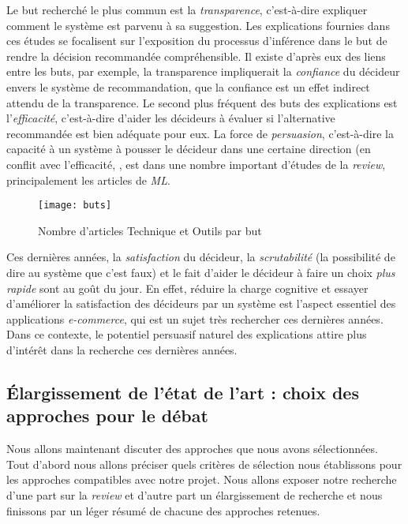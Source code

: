 \documentclass[a4paper, 11pt]{article}
\begin{document}
Le but recherché le plus commun est la \textit{transparence}, c'est-à-dire expliquer comment le système est parvenu à sa suggestion. Les explications fournies dans ces études se focalisent sur l’exposition du processus d’inférence dans le but de rendre la décision recommandée compréhensible. Il existe d'après eux des liens entre les buts, par exemple, la transparence impliquerait la \textit{confiance} du décideur envers le système de recommandation, que la confiance est un effet indirect attendu de la transparence. Le second plus fréquent des buts des explications est l’\textit{efficacité}, c'est-à-dire d’aider les décideurs à évaluer si l’alternative recommandée est bien adéquate pour eux. La force de \textit{persuasion}, c'est-à-dire la capacité à un système à pousser le décideur dans une certaine direction (en conflit avec l’efficacité, \textcolor{blue}{\citep{Chen2014}}, est dans une nombre important d’études de la \textit{review}, principalement les articles de \textit{ML}.

\begin{figure}[!h]
\begin{center}
\texttt{[image: buts]}
\caption{Nombre d'articles Technique et Outils par but}
\end{center}
\end{figure}


Ces dernières années, la \textit{satisfaction} du décideur, la \textit{scrutabilité} (la possibilité de dire au système que c’est faux) et le fait d’aider le décideur à faire un choix \textit{plus rapide} sont au goût du jour. En effet, réduire la charge cognitive et essayer d’améliorer la satisfaction des décideurs par un système est l’aspect essentiel des applications \textit{e-commerce}, qui est un sujet très rechercher ces dernières années. Dans ce contexte, le potentiel persuasif naturel des explications attire plus d’intérêt dans la recherche ces dernières années.

\subsection{Élargissement de l'état de l'art : choix des approches pour le débat}

Nous allons maintenant discuter des approches que nous avons sélectionnées. Tout d'abord nous allons préciser quels critères de sélection nous établissons pour les approches compatibles avec notre projet. Nous allons exposer notre recherche d'une part sur la \textit{review} et d'autre part un élargissement de recherche et nous finissons par un léger résumé de chacune des approches retenues.
\end{document}
